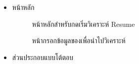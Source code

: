 \begin{itemize}
    \item หน้าหลัก
    \begin{figure}[H]\centering
    \setlength{\fboxrule}{0.2mm} %
    \setlength{\fboxsep}{0.5cm}
  \caption{\centering หน้าหลักสำหรับกดเริ่มวิเคราะห์ Resume}\label{fig:wireframe1_1}
\end{figure}
 \begin{figure}[H]\centering
    \setlength{\fboxrule}{0.2mm} %
    \setlength{\fboxsep}{0.5cm}
  \caption{\centering หน้ากรอกข้อมูลของเพื่อนำไปวิเคราะห์}\label{fig:wireframe1_2}
\end{figure}
    \item ส่วนประกอบแบบโต้ตอบ
  \begin{figure}[H]\centering
    \setlength{\fboxrule}{0.2mm} %
    \setlength{\fboxsep}{0.5cm}

\end{figure}
\end{itemize}
